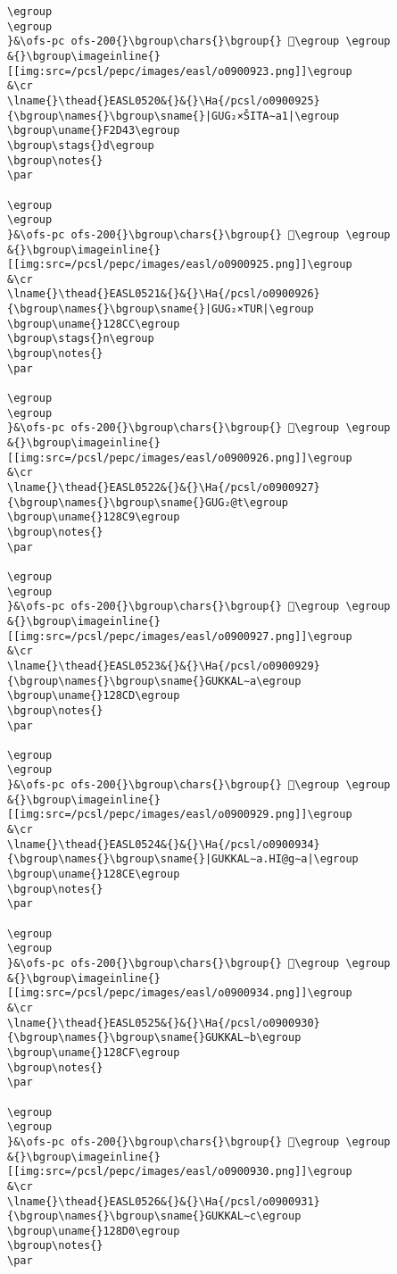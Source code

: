 \begin{verbatim}
\egroup
\egroup
}&\ofs-pc ofs-200{}\bgroup\chars{}\bgroup{} 𒣋\egroup \egroup
&{}\bgroup\imageinline{}[[img:src=/pcsl/pepc/images/easl/o0900923.png]]\egroup
&\cr
\lname{}\thead{}EASL0520&{}&{}\Ha{/pcsl/o0900925}{\bgroup\names{}\bgroup\sname{}|GUG₂×ŠITA∼a1|\egroup
\bgroup\uname{}F2D43\egroup
\bgroup\stags{}d\egroup
\bgroup\notes{}
\par 

\egroup
\egroup
}&\ofs-pc ofs-200{}\bgroup\chars{}\bgroup{} 󲵃\egroup \egroup
&{}\bgroup\imageinline{}[[img:src=/pcsl/pepc/images/easl/o0900925.png]]\egroup
&\cr
\lname{}\thead{}EASL0521&{}&{}\Ha{/pcsl/o0900926}{\bgroup\names{}\bgroup\sname{}|GUG₂×TUR|\egroup
\bgroup\uname{}128CC\egroup
\bgroup\stags{}n\egroup
\bgroup\notes{}
\par 

\egroup
\egroup
}&\ofs-pc ofs-200{}\bgroup\chars{}\bgroup{} 𒣌\egroup \egroup
&{}\bgroup\imageinline{}[[img:src=/pcsl/pepc/images/easl/o0900926.png]]\egroup
&\cr
\lname{}\thead{}EASL0522&{}&{}\Ha{/pcsl/o0900927}{\bgroup\names{}\bgroup\sname{}GUG₂@t\egroup
\bgroup\uname{}128C9\egroup
\bgroup\notes{}
\par 

\egroup
\egroup
}&\ofs-pc ofs-200{}\bgroup\chars{}\bgroup{} 𒣉\egroup \egroup
&{}\bgroup\imageinline{}[[img:src=/pcsl/pepc/images/easl/o0900927.png]]\egroup
&\cr
\lname{}\thead{}EASL0523&{}&{}\Ha{/pcsl/o0900929}{\bgroup\names{}\bgroup\sname{}GUKKAL∼a\egroup
\bgroup\uname{}128CD\egroup
\bgroup\notes{}
\par 

\egroup
\egroup
}&\ofs-pc ofs-200{}\bgroup\chars{}\bgroup{} 𒣍\egroup \egroup
&{}\bgroup\imageinline{}[[img:src=/pcsl/pepc/images/easl/o0900929.png]]\egroup
&\cr
\lname{}\thead{}EASL0524&{}&{}\Ha{/pcsl/o0900934}{\bgroup\names{}\bgroup\sname{}|GUKKAL∼a.HI@g∼a|\egroup
\bgroup\uname{}128CE\egroup
\bgroup\notes{}
\par 

\egroup
\egroup
}&\ofs-pc ofs-200{}\bgroup\chars{}\bgroup{} 𒣎\egroup \egroup
&{}\bgroup\imageinline{}[[img:src=/pcsl/pepc/images/easl/o0900934.png]]\egroup
&\cr
\lname{}\thead{}EASL0525&{}&{}\Ha{/pcsl/o0900930}{\bgroup\names{}\bgroup\sname{}GUKKAL∼b\egroup
\bgroup\uname{}128CF\egroup
\bgroup\notes{}
\par 

\egroup
\egroup
}&\ofs-pc ofs-200{}\bgroup\chars{}\bgroup{} 𒣏\egroup \egroup
&{}\bgroup\imageinline{}[[img:src=/pcsl/pepc/images/easl/o0900930.png]]\egroup
&\cr
\lname{}\thead{}EASL0526&{}&{}\Ha{/pcsl/o0900931}{\bgroup\names{}\bgroup\sname{}GUKKAL∼c\egroup
\bgroup\uname{}128D0\egroup
\bgroup\notes{}
\par 


\end{verbatim}
